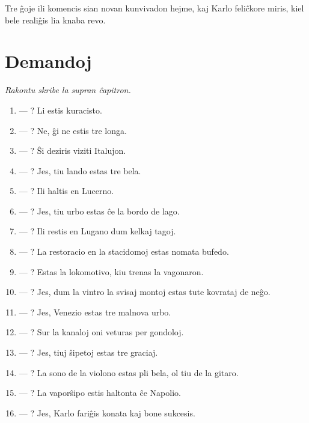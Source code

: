 Tre ĝoje ili komencis sian novan kunvivadon hejme, kaj Karlo feliĉkore miris, kiel bele realiĝis lia knaba revo.

\newpage

\section*{Demandoj}

\emph{Rakontu skribe la supran ĉapitron. }

\begin{enumerate}
    \item  — ? Li estis kuracisto.
    \item  — ? Ne, ĝi ne estis tre longa.
    \item  — ? Ŝi deziris viziti Italujon.
    \item  — ? Jes, tiu lando estas tre bela.
    \item  — ? Ili haltis en Lucerno.
    \item  — ? Jes, tiu urbo estas ĉe la bordo de lago.
    \item  — ? Ili restis en Lugano dum kelkaj tagoj.
    \item  — ? La restoracio en la stacidomoj estas nomata bufedo.
    \item  — ? Estas la lokomotivo, kiu trenas la vagonaron.
    \item  — ? Jes, dum la vintro la svisaj montoj estas tute kovrataj de neĝo.
    \item  — ? Jes, Venezio estas tre malnova urbo.
    \item  — ? Sur la kanaloj oni veturas per gondoloj.
    \item  — ? Jes, tiuj ŝipetoj estas tre graciaj.
    \item  — ? La sono de la violono estas pli bela, ol tiu de la gitaro.
    \item  — ? La vaporŝipo estis haltonta ĉe Napolio.
    \item  — ? Jes, Karlo fariĝis konata kaj bone sukcesis.
\end{enumerate}
